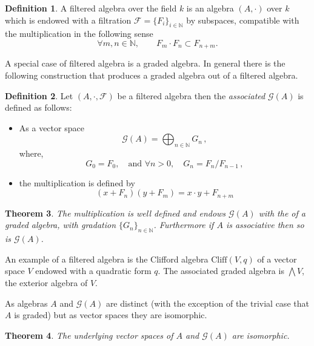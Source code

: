 \documentclass[12pt]{article}
\newtheorem{thm}{Theorem}
\theoremstyle{definition}
\newtheorem{defn}[thm]{Definition}
\theoremstyle{remark}
\numberwithin{equation}{subsection}
\begin{document}
\begin{defn}
A filtered algebra over the field $k$ is an algebra $(A,\cdot)$ over $k$
which is endowed with a filtration $\mathcal{F}=\{F_i\}_{i\in \mathbb{N}}$
by subspaces,  compatible with the multiplication in
the following sense
$$\forall m,n \in \mathbb{N},\qquad F_m\cdot F_n\subset F_{n+m}.$$
\end{defn}

A special case of filtered algebra is a graded algebra. In general there is
the following construction that produces a graded algebra out of a filtered
algebra.

\begin{defn}
Let $(A,\cdot,\mathcal{F})$ be a filtered algebra then the \emph{associated } $ \mathcal{G}(A)$ is defined as follows:
\begin{itemize}
\item As a vector space  
$$ \mathcal{G}(A)=\bigoplus_{n\in \mathbb{N}}G_n\,, $$
where,
$$G_0=F_0,\quad \text{and } \forall n>0, \quad G_n=F_n/F_{n-1}\,,$$
\item the multiplication is defined by
$$(x+F_{n})(y+F_{m})=x\cdot y+F_{n+m}$$   
\end{itemize}
\end{defn}

\begin{thm}
The multiplication is well defined and endows $\mathcal{G}(A)$ with the 
 of a graded algebra, with gradation 
$\{G_n\}_{n \in \mathbb{N}}$.
Furthermore if  $A$ is associative then so is $\mathcal{G}(A)$.
\end{thm}

An example of a filtered algebra is the Clifford algebra $\mathrm{Cliff}(V,q)$
of a vector space $V$ endowed with a quadratic form $q$. The associated
graded algebra is $\bigwedge V$, the exterior algebra of $V$.


As algebras
$A$ and $\mathcal{G}(A)$ are distinct (with the exception of the trivial
case that $A$ is graded) but as vector spaces they are isomorphic.  

\begin{thm}
 The underlying vector spaces of $A$ and $\mathcal{G}(A)$ are isomorphic. 
\end{thm}
\end{document}
